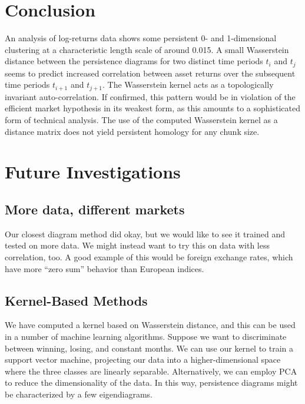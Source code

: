 \documentclass{article}
\begin{document}
\section{Conclusion}
\vspace{-15mm}
An analysis of log-returns data shows some persistent 0- and 1-dimensional clustering at a characteristic length scale of around 0.015. A small Wasserstein distance between the persistence diagrams for two distinct time periods $t_i$ and $t_j$ seems to predict increased correlation between asset returns over the subsequent time periods $t_{i+1}$ and $t_{j+1}$. The Wasserstein kernel acts as a topologically invariant auto-correlation. If confirmed, this pattern would be in violation of the efficient market hypothesis in its weakest form, as this amounts to a sophisticated form of technical analysis. The use of the computed Wasserstein kernel as a distance matrix does not yield persistent homology for any chunk size.

\section{Future Investigations}

\subsection{More data, different markets}
Our closest diagram method did okay, but we would like to see it trained and tested on more data. We might instead want to try this on data with less correlation, too. A good example of this would be foreign exchange rates, which have more “zero sum” behavior than European indices.

\subsection{Kernel-Based Methods}
We have computed a kernel based on Wasserstein distance, and this can be used in a number of machine learning algorithms. Suppose we want to discriminate between winning, losing, and constant months. We can use our kernel to train a support vector machine, projecting our data into a higher-dimensional space where the three classes are linearly separable. Alternatively, we can employ PCA to reduce the dimensionality of the data. In this way, persistence diagrams might be characterized by a few eigendiagrams.
\end{document}
